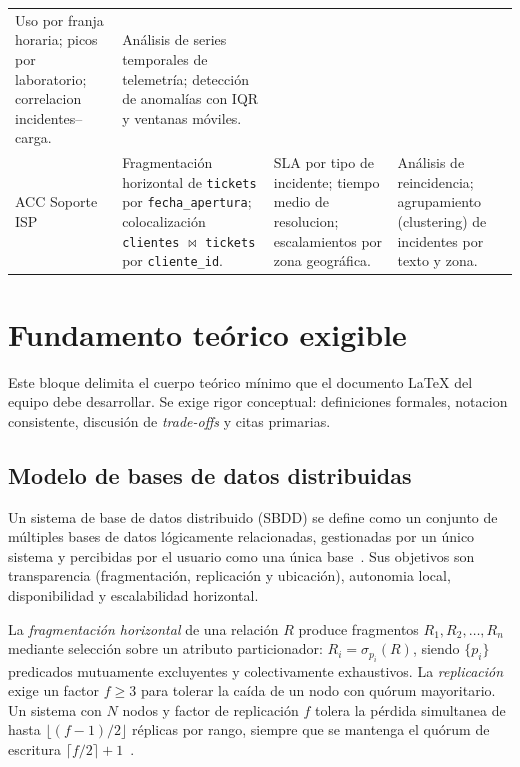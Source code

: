 \documentclass[11pt,a4paper]{article}
\begin{document}
\begin{xltabular}{\linewidth}{@{}p{1.9cm} X X X@{}}
        Uso por franja horaria; picos por laboratorio; correlacion incidentes--carga. &
        Análisis de series temporales de telemetría; detección de anomalías con IQR y ventanas móviles.\\
        \addlinespace
        ACC \newline Soporte ISP &
        Fragmentación horizontal de \texttt{tickets} por \texttt{fecha\_apertura}; colocalización \texttt{clientes} $\Join$ \texttt{tickets} por \texttt{cliente\_id}. &
        SLA por tipo de incidente; tiempo medio de resolucion; escalamientos por zona geográfica. &
        Análisis de reincidencia; agrupamiento (clustering) de incidentes por texto y zona.\\
    \end{xltabular}
    \normalsize

\section{Fundamento teórico exigible}

    Este bloque delimita el cuerpo teórico mínimo que el documento LaTeX del equipo debe desarrollar. Se exige rigor conceptual: definiciones formales, notacion consistente, discusión de \textit{trade-offs} y citas primarias.

\subsection{Modelo de bases de datos distribuidas}

    Un sistema de base de datos distribuido (SBDD) se define como un conjunto de múltiples bases de datos lógicamente relacionadas, gestionadas por un único sistema y percibidas por el usuario como una única base~\cite{Ozsu2020Distributed}. Sus objetivos son transparencia (fragmentación, replicación y ubicación), autonomia local, disponibilidad y escalabilidad horizontal.
    
    La \emph{fragmentación horizontal} de una relación $R$ produce fragmentos $R_1, R_2, \dots, R_n$ mediante selección sobre un atributo particionador: $R_i = \sigma_{p_i}(R)$, siendo $\{p_i\}$ predicados mutuamente excluyentes y colectivamente exhaustivos. La \emph{replicación} exige un factor $f\ge 3$ para tolerar la caída de un nodo con quórum mayoritario. Un sistema con $N$ nodos y factor de replicación $f$ tolera la pérdida simultanea de hasta $\lfloor (f-1)/2 \rfloor$ réplicas por rango, siempre que se mantenga el quórum de escritura $\lceil f/2 \rceil + 1$~\cite{Ongaro2014Raft,Taft2020CockroachDB}.
\end{document}
